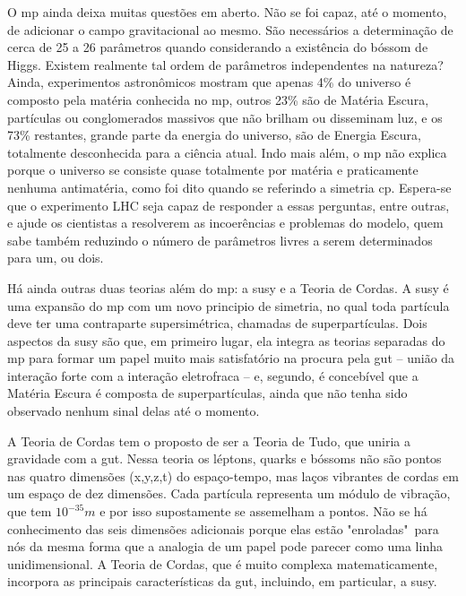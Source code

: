 O \gls{mp} ainda deixa muitas questões em aberto. Não se foi capaz, até o
momento, de adicionar o campo gravitacional ao mesmo. São necessários a
determinação de cerca de 25 a 26 parâmetros quando considerando a existência do
bóssom de Higgs. Existem realmente tal ordem de parâmetros independentes na
natureza? Ainda, experimentos astronômicos mostram que apenas 4\% do universo é
composto pela matéria conhecida no \gls{mp}, outros 23\% são de Matéria
Escura, partículas ou conglomerados massivos que não brilham ou disseminam luz,
e os 73\% restantes, grande parte da energia do universo, são de Energia Escura,
totalmente desconhecida para a ciência atual. Indo mais além, o \gls{mp} 
não explica porque o universo se consiste quase totalmente por matéria e
praticamente nenhuma antimatéria, como foi dito quando se referindo a simetria
\gls{cp}. Espera-se que o experimento LHC seja capaz de responder a essas perguntas, entre outras, 
e ajude os cientistas a resolverem as incoerências e problemas do modelo, quem sabe também reduzindo 
o número de parâmetros livres a serem determinados para um, ou dois.
\cite{nature_space_and_time,Intro_Nuclear}


Há ainda outras duas teorias além do \gls{mp}: a \gls{susy} e a Teoria de Cordas. 
A \gls{susy} é uma expansão do \gls{mp} com um
novo principio de simetria, no qual toda partícula deve ter uma contraparte
supersimétrica, chamadas de superpartículas. Dois aspectos da \gls{susy} são
que, em primeiro lugar, ela integra as teorias separadas do \gls{mp} para formar
um papel muito mais satisfatório na procura pela \gls{gut} -- união da interação
forte com a interação eletrofraca -- e, segundo, é concebível que a Matéria Escura 
é composta de superpartículas, ainda que não tenha sido observado nenhum sinal delas 
até o momento. 

A Teoria de Cordas tem o proposto de ser a Teoria de Tudo, que uniria a
gravidade com a \gls{gut}. Nessa teoria os léptons, quarks e bóssoms não são
pontos nas quatro dimensões (x,y,z,t) do espaço-tempo, mas laços vibrantes de
cordas em um espaço de dez dimensões. Cada partícula representa um módulo de
vibração, que tem $10^{-35} m$ e por isso supostamente se
assemelham a pontos. Não se há conhecimento das seis dimensões adicionais porque
elas estão "enroladas"~para nós da mesma forma que a analogia de um papel pode
parecer como uma linha unidimensional. A Teoria de Cordas, que é muito complexa
matematicamente, incorpora as principais características da \gls{gut}, incluindo,
em particular, a \gls{susy}.


